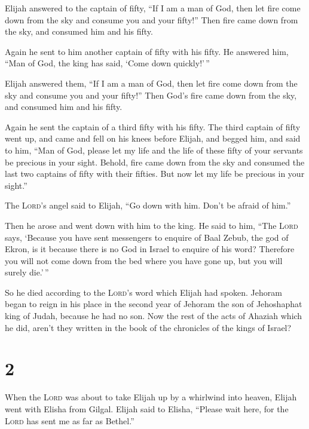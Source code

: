 Elijah answered to the captain of fifty, ``If I am a man
of God, then let fire come down from the sky and consume you and your
fifty!'' Then fire came down from the sky, and consumed him and his
fifty.

 Again he sent to him another captain of fifty with his
fifty. He answered him, ``Man of God, the king has said, `Come down
quickly!'\,''

 Elijah answered them, ``If I am a man of God, then let
fire come down from the sky and consume you and your fifty!'' Then God's
fire came down from the sky, and consumed him and his fifty.

 Again he sent the captain of a third fifty with his
fifty. The third captain of fifty went up, and came and fell on his
knees before Elijah, and begged him, and said to him, ``Man of God,
please let my life and the life of these fifty of your servants be
precious in your sight.  Behold, fire came down from the
sky and consumed the last two captains of fifty with their fifties. But
now let my life be precious in your sight.''

 The \textsc{Lord}'s angel said to Elijah, ``Go down with
him. Don't be afraid of him.''

Then he arose and went down with him to the king.  He
said to him, ``The \textsc{Lord} says, `Because you have sent messengers
to enquire of Baal Zebub, the god of Ekron, is it because there is no
God in Israel to enquire of his word? Therefore you will not come down
from the bed where you have gone up, but you will surely die.'\,''

 So he died according to the \textsc{Lord}'s word which
Elijah had spoken. Jehoram began to reign in his place in the second
year of Jehoram the son of Jehoshaphat king of Judah, because he had no
son.  Now the rest of the acts of Ahaziah which he did,
aren't they written in the book of the chronicles of the kings of
Israel?

\hypertarget{section-1}{%
\section{2}\label{section-1}}

 When the \textsc{Lord} was about to take Elijah up by a
whirlwind into heaven, Elijah went with Elisha from Gilgal.
 Elijah said to Elisha, ``Please wait here, for the
\textsc{Lord} has sent me as far as Bethel.''

